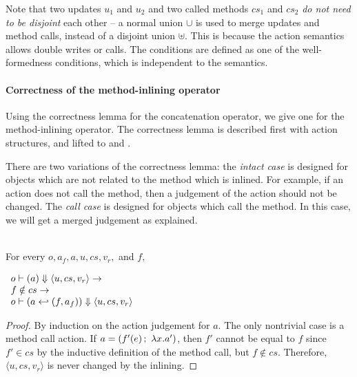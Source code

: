 Note that two updates $u_1$ and $u_2$ and two called methods $cs_1$
and $cs_2$ \emph{do not need to be disjoint} each other -- a normal
union $\cup$ is used to merge updates and method calls, instead of a
disjoint union $\uplus$. This is because the action semantics allows
double writes or calls. The conditions are defined as one of the
well-formedness conditions, which is independent to the semantics.

\paragraph{Correctness of the method-inlining operator}

Using the correctness lemma for the concatenation operator, we give
one for the method-inlining operator. The correctness lemma is
described first with action structures, and lifted to \Substep{} and
\Substeps{}.

There are two variations of the correctness lemma: the \emph{intact
  case} is designed for objects which are not related to the method
which is inlined. For example, if an action does not call the method,
then a judgement of the action should not be changed. The \emph{call
  case} is designed for objects which call the method. In this case,
we will get a merged judgement as explained.

\begin{lemma}
  \label{lem-inlinedm-action-intact}
  \mbox{}\\
  For every $o, a_f, a, u, cs, v_r,$ and $f,$
  \begin{center}
    \begin{math}
      \begin{array}{l}
        \semact{o}{a}{u}{cs}{v_r} \to \\
        f \notin cs \to \\
        \semact{o}{\inlinedm{a}{(f, a_f)}}{u}{cs}{v_r}
      \end{array}
    \end{math}
  \end{center}
\end{lemma}
\begin{proof}
  By induction on the action judgement for $a$. The only nontrivial
  case is a method call action. If $a = (\actcall{x}{f'}{e}{a'})$,
  then $f'$ cannot be equal to $f$ since $f' \in cs$ by the inductive
  definition of the method call, but $f \notin cs$. Therefore,
  $\langle u, cs, v_r \rangle$ is never changed by the inlining.
\end{proof}

